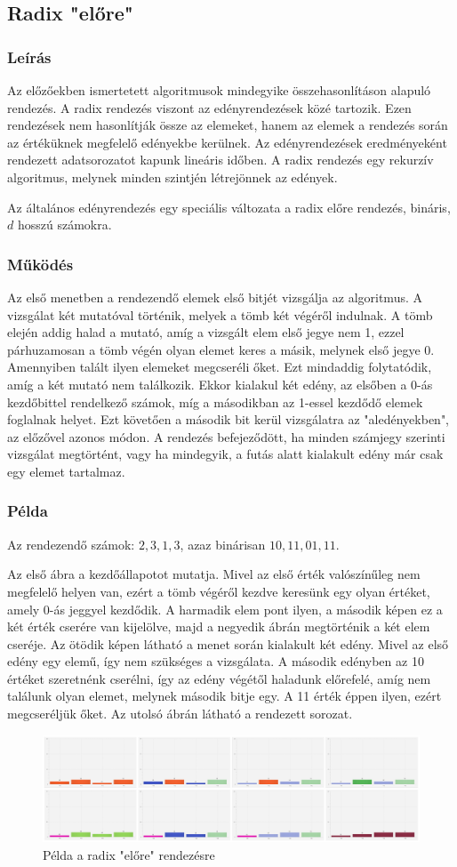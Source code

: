 \documentclass{elteikthesis}
\newcommand{\hiddensubsubsection}[1]{
	\stepcounter{subsubsection}
	\subsubsection*{{#1}}	
}
\begin{document}
\subsection{Radix "előre"}
\hiddensubsubsection{Leírás}
Az előzőekben ismertetett algoritmusok mindegyike összehasonlításon alapuló rendezés. A radix rendezés viszont az edényrendezések közé tartozik. Ezen rendezések nem hasonlítják össze az elemeket, hanem az elemek a rendezés során az értéküknek megfelelő edényekbe kerülnek. Az edényrendezések eredményeként rendezett adatsorozatot kapunk lineáris időben\cite{Ronyai}. 
A radix rendezés egy rekurzív algoritmus, melynek minden szintjén létrejönnek az edények.\par
Az általános edényrendezés egy speciális változata a radix előre rendezés, bináris, $d$ hosszú számokra.\par
\hiddensubsubsection{Működés}
Az első menetben a rendezendő elemek első bitjét vizsgálja az algoritmus. A vizsgálat két mutatóval történik, melyek a tömb két végéről indulnak. A tömb elején addig halad a mutató, amíg a vizsgált elem első jegye nem 1, ezzel párhuzamosan a tömb végén olyan elemet keres a másik, melynek első jegye 0. Amennyiben talált ilyen elemeket megcseréli őket. Ezt mindaddig folytatódik, amíg a két mutató nem találkozik. Ekkor kialakul két edény, az elsőben a 0-ás kezdőbittel rendelkező számok, míg a másodikban az 1-essel kezdődő elemek foglalnak helyet. Ezt követően a második bit kerül vizsgálatra az "aledényekben", az előzővel azonos módon. A rendezés befejeződött, ha minden számjegy szerinti vizsgálat megtörtént, vagy ha mindegyik, a futás alatt kialakult edény már csak egy elemet tartalmaz.
 \hiddensubsubsection{Példa}
 Az rendezendő számok: $2, 3, 1, 3$, azaz binárisan $10, 11, 01, 11$.\par
 Az első ábra a kezdőállapotot mutatja. Mivel az első érték valószínűleg nem megfelelő helyen van, ezért a tömb végéről kezdve keresünk egy olyan értéket, amely 0-ás jeggyel kezdődik. A harmadik elem pont ilyen, a második képen ez a két érték cserére van kijelölve, majd a negyedik ábrán megtörténik a két elem cseréje. Az ötödik képen látható a menet során kialakult két edény. Mivel az első edény egy elemű, így nem szükséges a vizsgálata. A második edényben az 10 értéket szeretnénk cserélni, így az edény végétől haladunk előrefelé, amíg nem találunk olyan elemet, melynek második bitje egy. A 11 érték éppen ilyen, ezért megcseréljük őket. Az utolsó ábrán látható a rendezett sorozat.\par
 \begin{figure}[H]
 	\centering
 	\includegraphics[width=1\textwidth]{pics/radixforward.jpg}
 	\caption{Példa a radix "előre" rendezésre}
 \end{figure}
\end{document}
